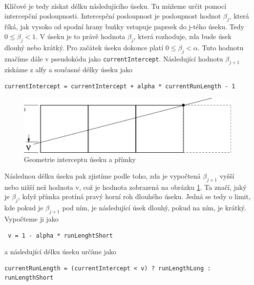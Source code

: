 \documentclass[report,11pt]{elsarticle}
\begin{document}
Klíčové je tedy získat délku následujícího úseku. Tu můžeme určit pomocí intercepční posloupnosti. Intercepční posloupnost je posloupnost hodnot \(\beta _j\), která říká, jak vysoko od spodní hrany buňky vstupuje paprsek do j-tého úseku. Tedy \(0 \leq \beta _{j} < 1\). V úseku je to právě hodnota \(\beta _j\), která rozhoduje, zda bude úsek dlouhý nebo krátký. Pro začátek úseku dokonce platí \(0 \leq \beta _{j} < \alpha\). Tuto hodnotu značíme dále v pseudokódu jako \verb|currentIntercept|. Následující hodnotu \(\beta _{j+1}\) získáme z alfy a současné délky úseku jako
\begin{verbatim}
currentIntercept = currentIntercept + alpha * currentRunLength - 1
\end{verbatim}


\begin{figure}[h]
\hfill\includegraphics[width=0.6\linewidth]{The-geometry-of-the-intercept-of-a-run-and-the-line.png}\hspace*{\fill}
\caption{Geometrie interceptu úseku a přímky}
\label{fig:geom}
\end{figure}


Následnou délku úseku pak zjistíme podle toho, zda je vypočtená \(\beta _{j+1}\) vyšší nebo nižší než hodnota v, což je hodnota zobrazená na obrázku \ref{fig:geom}. Ta značí, jaký je \(\beta _{j}\), když přímka protíná pravý horní roh dlouhého úseku. Jedná se tedy o limit, kde pokud je \(\beta _{j+1}\) pod ním, je následující úsek dlouhý, pokud na ním, je krátký. Vypočteme ji jako
 \begin{verbatim} v = 1 - alpha * runLenghtShort \end{verbatim}
 a následující délku úseku určíme jako
 \begin{verbatim}
currentRunLength = (currentIntercept < v) ? runLengthLong : runLengthShort
 \end{verbatim}
 
\end{document}
